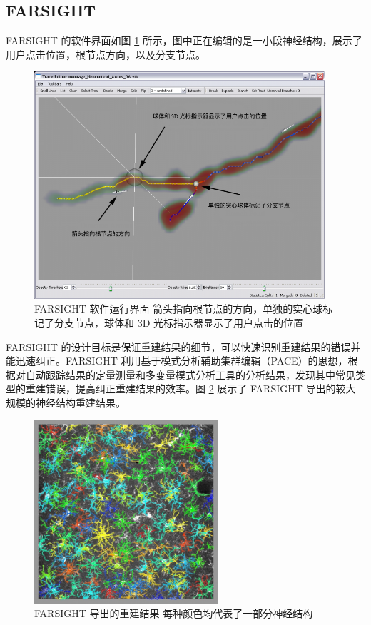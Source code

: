\subsection{FARSIGHT}
FARSIGHT 的软件界面如图 \ref{FARSIGHT} 所示，图中正在编辑的是一小段神经结构，展示了用户点击位置，根节点方向，以及分支节点。
\begin{figure}
\centering
\includegraphics[width=108mm]{images/FARSIGHT}
\caption{FARSIGHT 软件运行界面 箭头指向根节点的方向，单独的实心球标记了分支节点，球体和 3D 光标指示器显示了用户点击的位置}
\label{FARSIGHT}
\end{figure}

FARSIGHT 的设计目标是保证重建结果的细节，可以快速识别重建结果的错误并能迅速纠正。FARSIGHT 利用基于模式分析辅助集群编辑（PACE）的思想，根据对自动跟踪结果的定量测量和多变量模式分析工具的分析结果，发现其中常见类型的重建错误，提高纠正重建结果的效率。图 \ref{FARSIGHT-res} 展示了 FARSIGHT 导出的较大规模的神经结构重建结果。

\begin{figure}
\centering
\includegraphics[width=68mm]{images/FARSIGHT-res}
\caption{FARSIGHT 导出的重建结果 每种颜色均代表了一部分神经结构}
\label{FARSIGHT-res}
\end{figure}

